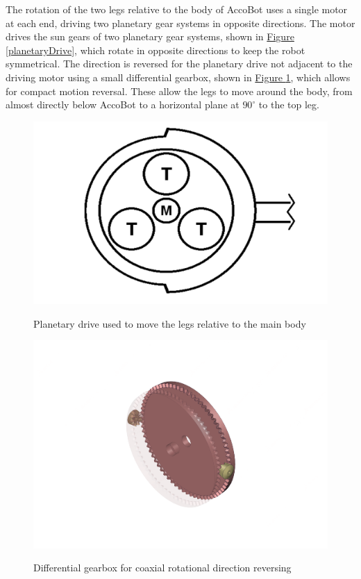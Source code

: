 \documentclass[11pt]{article}		%
\newlength{\imageheight}	 %
\newcommand{\figref}[1]{\hyperref[#1]{Figure \ref*{#1}}}    %
\begin{document}
				The rotation of the two legs relative to the body of AccoBot uses a single motor at each end, driving two planetary gear systems in opposite directions.
				The motor drives the sun gears of two planetary gear systems, shown in \figref{planetaryDrive}, which rotate in opposite directions to keep the robot symmetrical.
				The direction is reversed for the planetary drive not adjacent to the driving motor using a small differential gearbox, shown in \figref{diffGearbox}, which allows for compact motion reversal.
				These allow the legs to move around the body, from almost directly below AccoBot to a horizontal plane at $90^\circ$ to the top leg.
				\begin{figure}[h]
					\centering
					\begin{multicols}{2}
						\includegraphics[height=\imageheight]{planetaryDrive}
						\caption{Planetary drive used to move the legs relative to the main body}
						\label{planetaryDrive}
						\columnbreak
						\includegraphics[height=\imageheight]{diffGearbox}
						\caption{Differential gearbox for coaxial rotational direction reversing}
						\label{diffGearbox}
					\end{multicols}
				\end{figure}
\end{document}
